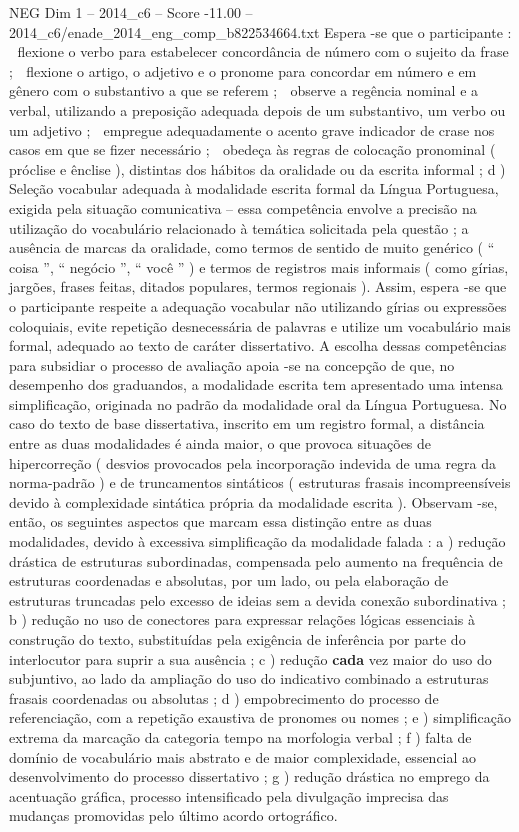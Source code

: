 \begin{textsample}{NEG Dim 1 – 2014\_c6 – Score -11.00 – 2014\_c6/enade\_2014\_eng\_comp\_b822534664.txt}
Espera -se que o participante :  flexione o verbo para estabelecer concordância de número com o sujeito da frase ;  flexione o artigo, o adjetivo e o pronome para concordar em número e em gênero com o substantivo a que se referem ;  observe a regência nominal e a verbal, utilizando a preposição adequada depois de um substantivo, um verbo ou um adjetivo ;  empregue adequadamente o acento grave indicador de crase nos casos em que se fizer necessário ;  obedeça às regras de colocação pronominal ( próclise e ênclise ), distintas dos hábitos da oralidade ou da escrita informal ; d ) Seleção vocabular adequada à modalidade escrita formal da Língua Portuguesa, exigida pela situação comunicativa – essa competência envolve a precisão na utilização do vocabulário relacionado à temática solicitada pela questão ; a ausência de marcas da oralidade, como termos de sentido de muito genérico ( “ coisa ”, “ negócio ”, “ você ” ) e termos de registros mais informais ( como gírias, jargões, frases feitas, ditados populares, termos regionais ).
Assim, espera -se que o participante respeite a adequação vocabular não utilizando gírias ou expressões coloquiais, evite repetição desnecessária de palavras e utilize um vocabulário mais formal, adequado ao texto de caráter dissertativo.
A escolha dessas competências para subsidiar o processo de avaliação apoia -se na concepção de que, no desempenho dos graduandos, a modalidade escrita tem apresentado uma intensa simplificação, originada no padrão da modalidade oral da Língua Portuguesa.
No caso do texto de base dissertativa, inscrito em um registro formal, a distância entre as duas modalidades é ainda maior, o que provoca situações de hipercorreção ( desvios provocados pela incorporação indevida de uma regra da norma-padrão ) e de truncamentos sintáticos ( estruturas frasais incompreensíveis devido à complexidade sintática própria da modalidade escrita ).
Observam -se, então, os seguintes aspectos que marcam essa distinção entre as duas modalidades, devido à excessiva simplificação da modalidade falada : a ) redução drástica de estruturas subordinadas, compensada pelo aumento na frequência de estruturas coordenadas e absolutas, por um lado, ou pela elaboração de estruturas truncadas pelo excesso de ideias sem a devida conexão subordinativa ; b ) redução no uso de conectores para expressar relações lógicas essenciais à construção do texto, substituídas pela exigência de inferência por parte do interlocutor para suprir a sua ausência ; c ) redução \textbf{cada} vez maior do uso do subjuntivo, ao lado da ampliação do uso do indicativo combinado a estruturas frasais coordenadas ou absolutas ; d ) empobrecimento do processo de referenciação, com a repetição exaustiva de pronomes ou nomes ; e ) simplificação extrema da marcação da categoria tempo na morfologia verbal ; f ) falta de domínio de vocabulário mais abstrato e de maior complexidade, essencial ao desenvolvimento do processo dissertativo ; g ) redução drástica no emprego da acentuação gráfica, processo intensificado pela divulgação imprecisa das mudanças promovidas pelo último acordo ortográfico.

\end{textsample}
